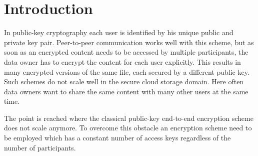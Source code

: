 \chapter{Introduction}
\label{sec:introduction}
In public-key cryptography each user is identified by his unique public and private key pair. Peer-to-peer communication works well with this scheme, but as soon as an encrypted content needs to be accessed by multiple participants, the data owner has to encrypt the content for each user explicitly. This results in many encrypted versions of the same  file, each secured by a different public key. Such schemes do not scale well in the secure cloud storage domain. Here often data owners want to share the same content with many other users at the same time.

The point is reached where the classical public-key end-to-end encryption scheme does not scale anymore. To overcome this obstacle an encryption scheme need to be employed which has a constant number of access keys regardless of the number of participants.

